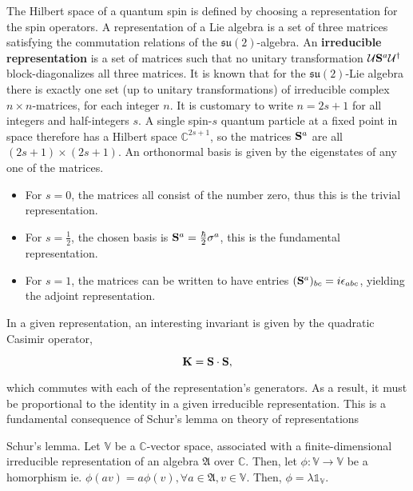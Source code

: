 \documentclass{homework}
\begin{document}
The Hilbert space of a quantum spin is defined by choosing a representation for the spin operators. A representation of a Lie algebra is a set of three matrices satisfying the commutation relations of the $\mathfrak{su}(2)$-algebra. An \textbf{irreducible representation} is a set of matrices such that no unitary transformation $\mathcal{U} {\bf S}^{a} \mathcal{U}^\dagger$ block-diagonalizes all three matrices. It is known that for the $\mathfrak{su}(2)$-Lie algebra there is exactly one set (up to unitary transformations) of irreducible complex $n\times n$-matrices, for each integer $n$. It is customary to write $n=2s+1$ for all integers and half-integers $s$. A single spin-$s$ quantum particle at a fixed point in space therefore has a Hilbert space $\mathds{C}^{2s+1}$, so the matrices ${\bf S}^a$ are all $(2s+1)\times(2s+1)$. An orthonormal basis is given by the eigenstates of any one of the matrices. 

\begin{itemize}
    \item For $s=0$, the matrices all consist of the number zero, thus this is the trivial representation. 
    \item For $s = \frac{1}{2}$, the chosen basis is ${\bf S}^a = \frac{\hbar}{2} \sigma^a$, this is the fundamental representation.
    \item For $s=1$, the matrices can be written to have entries $({\bf S}^a)_{bc} = i \epsilon_{abc}$, yielding the adjoint representation.
\end{itemize}

In a given representation, an interesting invariant is given by the quadratic Casimir operator, 

$$
{\bf K} = {\bf S} \cdot {\bf S},
$$

which commutes with each of the representation's generators. As a result, it must be proportional to the identity in a given irreducible representation. This is a fundamental consequence of Schur's lemma on theory of representations 

\begin{lemma}Schur's lemma. 
    Let $\mathds{V}$ be a $\mathds{C}$-vector space, associated with a finite-dimensional irreducible representation of an algebra $\mathfrak{A}$ over $\mathds{C}$. Then, let $\phi : \mathds{V} \rightarrow \mathds{V}$ be a homorphism ie. $\phi(av) = a\phi(v), \forall a \in \mathfrak{A}, v \in \mathds{V}$. Then, $\phi = \lambda \mathds{1}_{\mathds{V}}.$ \\
\end{lemma}
\end{document}
